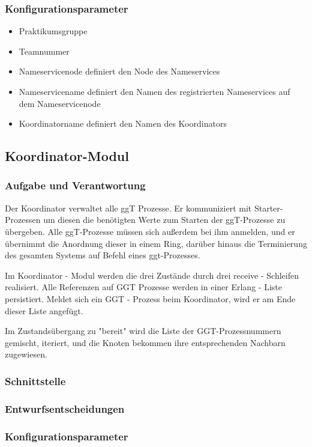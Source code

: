 \documentclass{article}
\begin{document}
\subsubsection{Konfigurationsparameter}
\begin{itemize}
    \item Praktikumsgruppe
    \item Teamnummer
    \item Nameservicenode definiert den Node des Nameservices
    \item Nameservicename definiert den Namen des registrierten Nameservices auf dem Nameservicenode
    \item Koordinatorname definiert den Namen des Koordinators
\end{itemize}

\newpage

\subsection{Koordinator-Modul}
\subsubsection{Aufgabe und Verantwortung}

Der Koordinator verwaltet alle ggT Prozesse. Er kommuniziert mit Starter-Prozessen um diesen die benötigten
Werte zum Starten der ggT-Prozesse zu übergeben. Alle ggT-Prozesse müssen sich außerdem bei ihm anmelden,
und er übernimmt die Anordnung dieser in einem Ring, darüber hinaus die Terminierung des gesamten Systems auf Befehl eines
ggt-Prozesses.

Im Koordinator - Modul werden die drei Zustände durch drei receive - Schleifen realisiert. Alle Referenzen auf GGT
Prozesse werden in einer Erlang - Liste persistiert. Meldet sich ein GGT - Prozess beim Koordinator,
wird er am Ende dieser Liste angefügt.

Im Zustandsübergang zu "bereit" wird die Liste der GGT-Prozessnummern gemischt, iteriert,
und die Knoten bekommen ihre entsprechenden Nachbarn zugewiesen.


\subsubsection{Schnittstelle}

\subsubsection{Entwurfsentscheidungen}

\subsubsection{Konfigurationsparameter}
\end{document}
